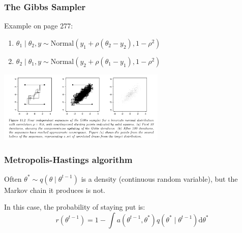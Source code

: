\documentclass{beamer}
\begin{document}
\begin{frame}
\frametitle{The Gibbs Sampler}

Example on page 277:
\begin{enumerate}
\item $\theta_1 \mid \theta_2, y \sim \text{Normal}(y_1 + \rho(\theta_2 - y_2), 1-\rho^2)$
\item $\theta_2 \mid \theta_1, y \sim \text{Normal}(y_2 + \rho(\theta_1 - y_1), 1-\rho^2)$
\end{enumerate}

\begin{center}
\includegraphics[width=80mm]{gibbs.png}
\end{center}


\end{frame}

\begin{frame}
\frametitle{Metropolis-Hastings algorithm}

Often $\theta^* \sim q(\theta \mid \theta^{t-1})$ is a density (continuous random variable), but the Markov chain it produces is not. 
\newline

In this case, the probability of staying put is: 
$$
r(\theta^{t-1}) = 1 - \int a(\theta^{t-1}, \theta^*)q(\theta^* \mid \theta^{t-1}) \text{d}\theta^* 
$$



\end{frame}
\end{document}
